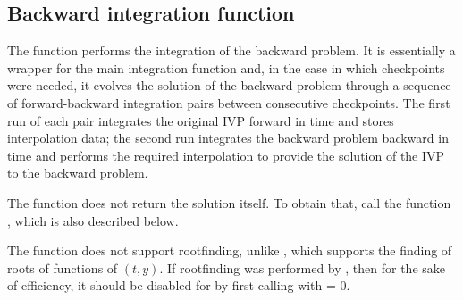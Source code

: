 \subsection{Backward integration function}
\label{sss:cvsolveb}

The function  performs the integration of the backward problem.
It is essentially a wrapper for the {\cvodes} main integration function
 and, in the case in which checkpoints were needed, it evolves
the solution of the backward problem through a sequence of forward-backward
integration pairs between consecutive checkpoints.
The first run of each pair integrates the original IVP forward in time and
stores interpolation data; the second run integrates the backward problem
backward in time and performs the required interpolation to provide
the solution of the IVP to the backward problem.

The function  does not return the solution  itself.
To obtain that, call the function , which is also
described below.

The  function does not support rootfinding, unlike ,
which supports the finding of roots of functions of $(t,y)$.  If rootfinding
was performed by , then for the sake of efficiency, it should be
disabled for  by first calling  with  = 0.


